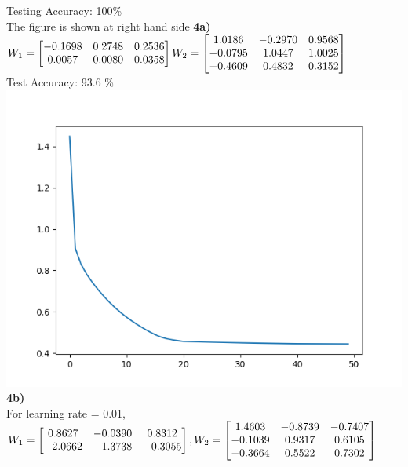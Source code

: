 \documentclass[12pt]{article}
\begin{document}
Testing Accuracy: 100\%\\
The figure is shown at right hand side\newpage
\textbf{4a)}\\
$W_{1} = \begin{bmatrix}-0.1698 & 0.2748 & 0.2536\\
0.0057 & 0.0080 & 0.0358\\\end{bmatrix}\\ W_{2} =
\begin{bmatrix}
1.0186 & -0.2970 & 0.9568\\
-0.0795 & 1.0447 & 1.0025\\
-0.4609 & 0.4832 & 0.3152\\\end{bmatrix}$ \\      
Test Accuracy: 93.6 \%\\
\includegraphics[scale=0.5]{train_loss_q4a}\\
\textbf{4b)}\\
For learning rate = 0.01,\\
$ W_{1} = \begin{bmatrix}
0.8627 & -0.0390 &  0.8312\\
-2.0662 & -1.3738 & -0.3055\end{bmatrix}\\, W_{2} = 
\begin{bmatrix}
1.4603 & -0.8739 & -0.7407\\
-0.1039 & 0.9317 & 0.6105\\
-0.3664 & 0.5522 & 0.7302\end{bmatrix}$ \\     
\end{document}
